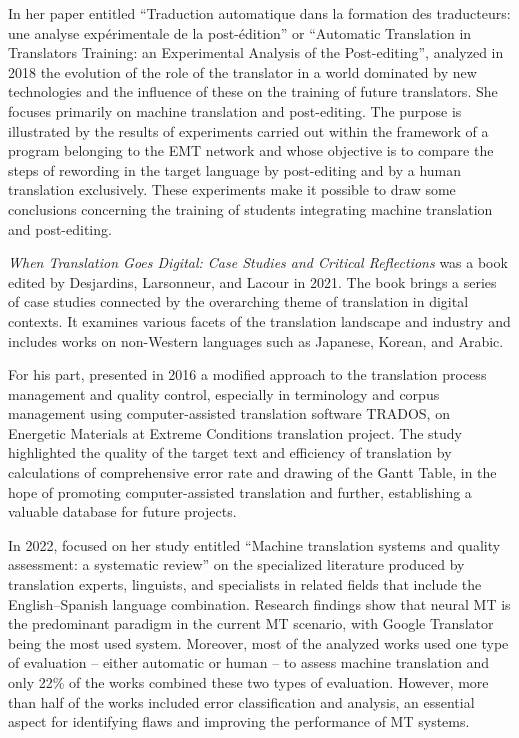 \documentclass[english]{textolivre}
\begin{document}
In her paper entitled “Traduction automatique dans la formation des traducteurs: une analyse expérimentale de la post-édition” or “Automatic Translation in Translators Training: an Experimental Analysis of the Post-editing”, \textcite{tomaszkiewicz2018traduction} analyzed in 2018 the evolution of the role of the translator in a world dominated by new technologies and the influence of these on the training of future translators. She focuses primarily on machine translation and post-editing. The purpose is illustrated by the results of experiments carried out within the framework of a program belonging to the EMT network and whose objective is to compare the steps of rewording in the target language by post-editing and by a human translation exclusively. These experiments make it possible to draw some conclusions concerning the training of students integrating machine translation and post-editing.

\emph{When Translation Goes Digital: Case Studies and Critical Reflections} was a book edited by Desjardins, Larsonneur, and Lacour in 2021. The book brings a series of case studies connected by the overarching theme of translation in digital contexts. It examines various facets of the translation landscape and industry and includes works on non-Western languages such as Japanese, Korean, and Arabic.

For his part, \textcite{wang_translation_2016} presented in 2016 a modified approach to the translation process management and quality control, especially in terminology and corpus management using computer-assisted translation software TRADOS, on Energetic Materials at Extreme Conditions translation project. The study highlighted the quality of the target text and efficiency of translation by calculations of comprehensive error rate and drawing of the Gantt Table, in the hope of promoting computer-assisted translation and further, establishing a valuable database for future projects.

In 2022, \textcite{rivera-trigueros_machine_2022} focused on her study entitled “Machine translation systems and quality assessment: a systematic review” on the specialized literature produced by translation experts, linguists, and specialists in related fields that include the English–Spanish language combination. Research findings show that neural MT is the predominant paradigm in the current MT scenario, with Google Translator being the most used system. Moreover, most of the analyzed works used one type of evaluation – either automatic or human – to assess machine translation and only 22\% of the works combined these two types of evaluation. However, more than half of the works included error classification and analysis, an essential aspect for identifying flaws and improving the performance of MT systems.
\end{document}
